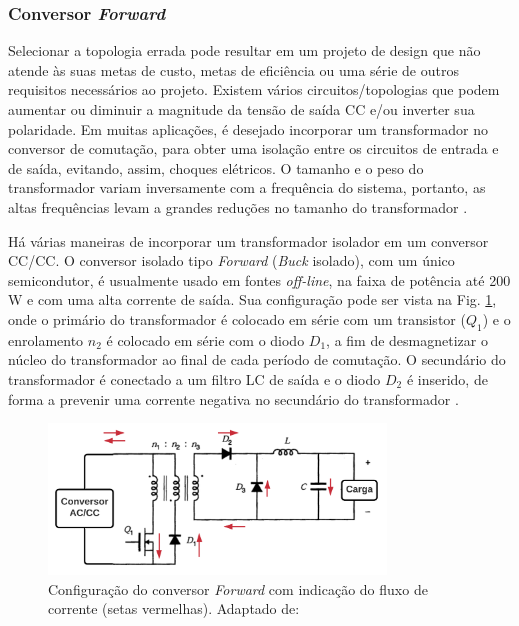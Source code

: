 \subsubsection*{Conversor \textit{Forward}}

Selecionar a topologia errada pode resultar em um projeto de design que não atende às suas metas de custo, metas de eficiência ou uma série de outros requisitos necessários ao projeto. Existem vários circuitos/topologias que podem aumentar ou diminuir a magnitude da tensão de saída CC e/ou inverter sua polaridade. Em muitas aplicações, é desejado incorporar um transformador no conversor de comutação, para obter uma isolação entre os circuitos de entrada e de saída, evitando, assim, choques elétricos. O tamanho e o peso do transformador variam inversamente com a frequência do sistema, portanto, as altas frequências levam a grandes reduções no tamanho do transformador \cite{forward}.

Há várias maneiras de incorporar um transformador isolador em um conversor CC/CC. O conversor isolado tipo \textit{Forward} (\textit{Buck} isolado), com um único semicondutor, é usualmente usado em fontes \textit{off-line}, na faixa de potência até 200 W e com uma alta corrente de saída. Sua configuração pode ser vista na Fig. \ref{fig:energia_forward}, onde o primário do transformador é colocado em série com um transistor ($Q_{1}$) e o enrolamento $n_{2}$ é colocado em série com o diodo $D_{1}$, a fim de desmagnetizar o núcleo do transformador ao final de cada período de comutação. O secundário do transformador é conectado a um filtro LC de saída e o diodo $D_{2}$ é inserido, de forma a prevenir uma corrente negativa no secundário do transformador  \cite{Conversores}.

\begin{figure}[H]
\centering
    \includegraphics[width=0.8\textwidth]{figuras/energia/circuitos/Energia_forward.png}
    \caption{Configuração do conversor  \textit{Forward} com indicação do fluxo de corrente (setas vermelhas). Adaptado de: \cite{forward}}
    \label{fig:energia_forward}
\end{figure}

